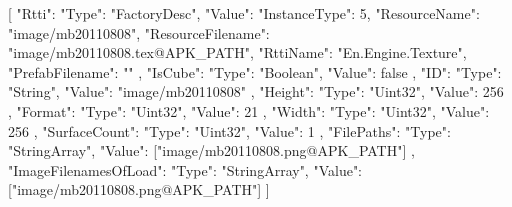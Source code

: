 [{
        "Rtti": {
            "Type": "FactoryDesc",
            "Value": {
                "InstanceType": 5,
                "ResourceName": "image/mb20110808",
                "ResourceFilename": "image/mb20110808.tex@APK_PATH",
                "RttiName": "En.Engine.Texture",
                "PrefabFilename": ""
            }
        },
        "IsCube": {
            "Type": "Boolean",
            "Value": false
        },
        "ID": {
            "Type": "String",
            "Value": "image/mb20110808"
        },
        "Height": {
            "Type": "Uint32",
            "Value": 256
        },
        "Format": {
            "Type": "Uint32",
            "Value": 21
        },
        "Width": {
            "Type": "Uint32",
            "Value": 256
        },
        "SurfaceCount": {
            "Type": "Uint32",
            "Value": 1
        },
        "FilePaths": {
            "Type": "StringArray",
            "Value": ["image/mb20110808.png@APK_PATH"]
        },
        "ImageFilenamesOfLoad": {
            "Type": "StringArray",
            "Value": ["image/mb20110808.png@APK_PATH"]
        }
    }]